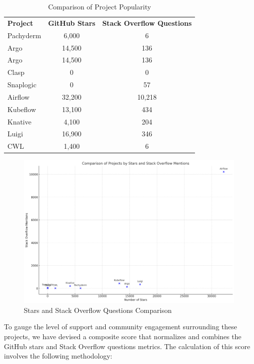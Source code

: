 \begin{table}[htb]
    \centering
    \caption{Comparison of Project Popularity}
    \label{tab:table1} 
    \begin{tabular}{|l|c|c|} 
      \textbf{Project} & \textbf{GitHub Stars} & \textbf{Stack Overflow Questions} \\ 
      Pachyderm  & 6,000   & 6          \\ 
      Argo       & 14,500  & 136        \\ 
      Argo       & 14,500  & 136        \\ 
      Clasp      & 0       & 0          \\ 
      Snaplogic  & 0       & 57         \\ 
      Airflow    & 32,200  & 10,218     \\ 
      Kubeflow   & 13,100  & 434        \\ 
      Knative    & 4,100   & 204        \\ 
      Luigi      & 16,900  & 346        \\ 
      CWL        & 1,400   & 6          \\ 
   \end{tabular}
\end{table}


\begin{figure}[htb]
    \centering
    \includegraphics[width=12cm]{graphics/Stars_stackoverflow_comparison.png}
    \caption[Stars and Stack overflow Questions Comparison]{Stars and Stack Overflow Questions Comparison}
    \label{abb:stars_stackoverflow_comparison}
\end{figure}

To gauge the level of support and community engagement surrounding these projects, we have devised a composite score that normalizes and combines the GitHub stars and Stack Overflow questions metrics. The calculation of this score involves the following methodology:

